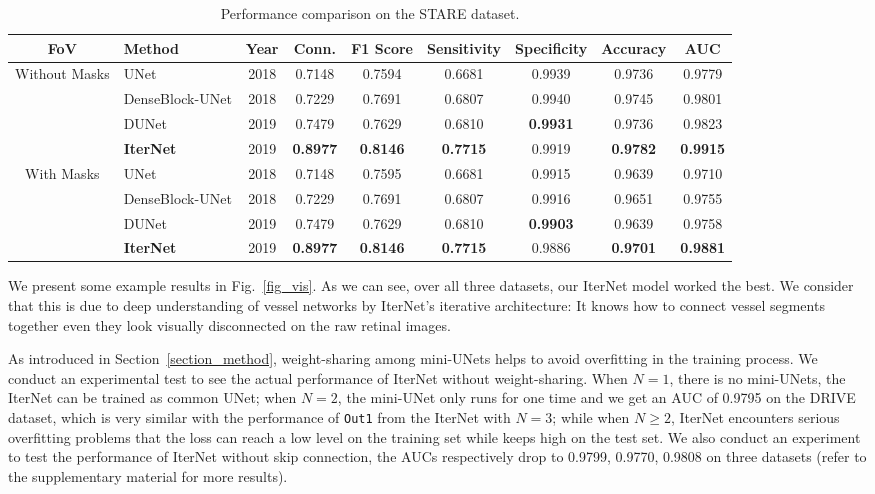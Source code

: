 \documentclass[10pt,twocolumn,letterpaper]{article}
\begin{document}
\begin{table*}[!t]
	\caption{Performance comparison on the STARE dataset.}
	\label{table_detect_performance_stare}
	\centering
	\begin{tabular}{cl|c|cccccc}
		\hline
		FoV &Method & Year & Conn. & F1 Score & Sensitivity & Specificity & Accuracy & AUC\\ 
		\hline					
		
		\multirow{4}{*}{Without Masks} &UNet  & 2018& 0.7148 &0.7594&   0.6681& 0.9939 & 0.9736 & 0.9779\\
		&DenseBlock-UNet& 2018& 0.7229 & 0.7691 &0.6807& 0.9940& 0.9745 &0.9801\\
		&DUNet &2019& 0.7479 &0.7629&  0.6810 & \textbf{0.9931} &  0.9736& 0.9823\\
		&\textbf{IterNet} & 2019&\textbf{0.8977}&  \textbf{0.8146} &  \textbf{0.7715} & 0.9919 & \textbf{0.9782}& \textbf{0.9915}\\
		
		\hline
		
		\multirow{4}{*}{With Masks}&UNet & 2018& 0.7148 &0.7595&   0.6681& 0.9915 & 0.9639 & 0.9710\\		
		&DenseBlock-UNet& 2018& 0.7229 & 0.7691 &0.6807& 0.9916& 0.9651 &0.9755\\
		&DUNet &2019& 0.7479 &0.7629&  0.6810 & \textbf{0.9903} &  0.9639& 0.9758\\		
		&\textbf{IterNet} & 2019&\textbf{0.8977}&  \textbf{0.8146} &  \textbf{0.7715} & 0.9886 & \textbf{0.9701}& \textbf{0.9881}\\
		\hline
	\end{tabular}
\end{table*}


We present some example results in Fig.~\ref{fig_vis}. As we can see, over all three datasets, our IterNet model worked the best. We consider that this is due to deep understanding of vessel networks by IterNet's iterative architecture: It knows how to connect vessel segments together even they look visually disconnected on the raw retinal images.

As introduced in Section~\ref{section_method}, weight-sharing among mini-UNets helps to avoid overfitting in the training process. We conduct an experimental test to see the actual performance of IterNet without weight-sharing. When $N=1$, there is no mini-UNets, the IterNet can be trained as common UNet; when $N=2$, the mini-UNet only runs for one time and we get an AUC of 0.9795 on the DRIVE dataset, which is very similar with the performance of \texttt{Out1} from the IterNet with $N=3$; while when $N\ge2$, IterNet encounters serious overfitting problems that the loss can reach a low level on the training set while keeps high on the test set. 
We also conduct an experiment to test the performance of IterNet without skip connection, the AUCs respectively drop to 0.9799, 0.9770, 0.9808 on three datasets (refer to the supplementary material for more results).
\end{document}
